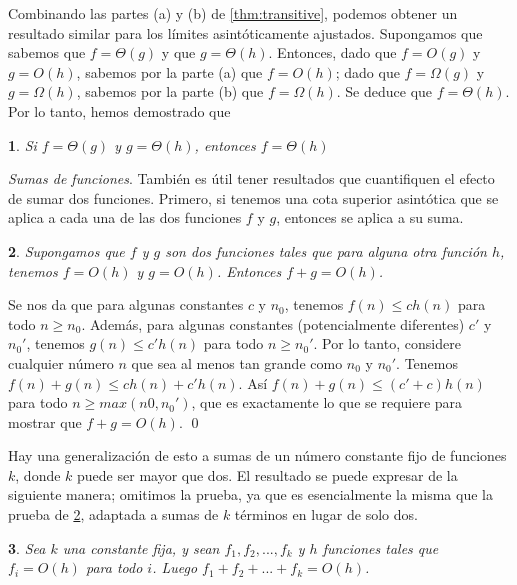 \documentclass[a4paper, 12pt]{book}
\theoremstyle{dotless}
\newtheorem{theorem}{}[section]
\renewenvironment{proof}{\vspace{12pt}{\noindent\bfseries Demostración.}}{\qed\vspace{12pt}}
\begin{document}
Combinando las partes (a) y (b) de \ref{thm:transitive}, podemos obtener un resultado similar para los límites asintóticamente ajustados. Supongamos que sabemos que $f=\Theta(g)$ y que $g=\Theta(h)$. Entonces, dado que $f=O(g)$ y $g=O(h)$, sabemos por la parte (a) que $f=O(h)$; dado que $f=\Omega(g)$ y $g=\Omega(h)$, sabemos por la parte (b) que $f=\Omega(h)$. Se deduce que $f=\Theta(h)$. Por lo tanto, hemos demostrado que

\begin{theorem}
Si $f=\Theta(g)$ y $g=\Theta(h)$, entonces $f=\Theta(h)$
\end{theorem}

\textit{Sumas de funciones}. También es útil tener resultados que cuantifiquen el efecto de sumar dos funciones. Primero, si tenemos una cota superior asintótica que se aplica a cada una de las dos funciones $f$ y $g$, entonces se aplica a su suma.

\begin{theorem}
\label{thm:sumadedosfunc}
Supongamos que $f$ y $g$ son dos funciones tales que para alguna otra función $h$, tenemos $f = O(h)$ y $g = O(h)$. Entonces $f + g = O (h)$.
\end{theorem}

\begin{proof}
Se nos da que para algunas constantes $c$ y $n_0$, tenemos $f(n)≤ch(n)$ para todo $n≥n_0$. Además, para algunas constantes (potencialmente diferentes) $c'$ y $n_0'$, tenemos $g(n)≤c'h(n)$ para todo $n≥n_0'$. Por lo tanto, considere cualquier número $n$ que sea al menos tan grande como $n_0$ y $n_0'$. Tenemos $f(n) + g (n) ≤ ch (n) + c'h (n)$. Así $f (n) + g (n) ≤ (c' + c) h (n)$ para todo $n≥max(n0, n_0')$, que es exactamente lo que se requiere para mostrar que $f + g = O (h)$.
\end{proof}

Hay una generalización de esto a sumas de un número constante fijo de funciones $k$, donde $k$ puede ser mayor que dos. El resultado se puede expresar de la siguiente manera; omitimos la prueba, ya que es esencialmente la misma que la prueba de \ref{thm:sumadedosfunc}, adaptada a sumas de $k$ términos en lugar de solo dos.

\begin{theorem}
\label{thm:sumadekfunc}
Sea $k$ una constante fija, y sean $f_1, f_2, ..., f_k$ y $h$  funciones tales que $f_i = O(h)$ para todo $i$. Luego $f_1 + f_2 + ... + f_k = O (h)$.
\end{theorem}
\end{document}
